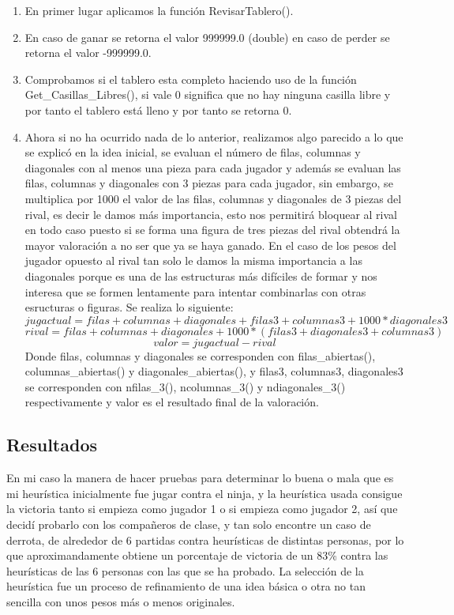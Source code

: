 \documentclass[a4paper, 10pt]{article} %
\begin{document}
\begin{enumerate}
\item En primer lugar aplicamos la función RevisarTablero().
\item En caso de ganar se retorna el valor 999999.0 (double) en caso de perder se retorna el valor -999999.0.
\item Comprobamos si el tablero esta completo haciendo uso de la función Get\_Casillas\_Libres(), si vale 0 significa que no hay ninguna casilla libre y por tanto el tablero está lleno y por tanto se retorna 0.
\item Ahora si no ha ocurrido nada de lo anterior, realizamos algo parecido a lo que se explicó en la idea inicial, se evaluan el número de filas, columnas y diagonales con al menos una pieza para cada jugador y además se evaluan las filas, columnas y diagonales con 3 piezas para cada jugador, sin embargo, se multiplica por 1000 el valor de las filas, columnas y diagonales de 3 piezas del rival, es decir le damos más importancia, esto nos permitirá bloquear al rival en todo caso puesto si se forma una figura de tres piezas del rival obtendrá la mayor valoración a no ser que ya se haya ganado. En el caso de los pesos del jugador opuesto al rival tan solo le damos la misma importancia a las diagonales porque es una de las estructuras más difíciles de formar y nos interesa que se formen lentamente para intentar combinarlas con otras esructuras o figuras. Se realiza lo siguiente:
$$jugactual=filas+columnas+diagonales+filas3+columnas3+1000*diagonales3$$
$$rival=filas+columnas+diagonales+1000*(filas3+diagonales3+columnas3)$$
$$valor=jugactual-rival$$
Donde filas, columnas y diagonales se corresponden con filas\_abiertas(), columnas\_abiertas() y diagonales\_abiertas(), y filas3, columnas3, diagonales3 se corresponden con nfilas\_3(), ncolumnas\_3() y ndiagonales\_3() respectivamente y valor es el resultado final de la valoración.
\end{enumerate}

\subsection{Resultados}
En mi caso la manera de hacer pruebas para determinar lo buena o mala que es mi heurística inicialmente fue jugar contra el ninja, y la heurística usada consigue la victoria tanto si empieza como jugador 1 o si empieza como jugador 2, así que decidí probarlo con los compañeros de clase, y tan solo encontre un caso de derrota, de alrededor de 6 partidas contra heurísticas de distintas personas, por lo que aproximandamente obtiene un porcentaje de victoria de un 83\% contra las heurísticas de las 6 personas con las que se ha probado. La selección de la heurística fue un proceso de refinamiento de una idea básica o otra no tan sencilla con unos pesos más o menos originales.
\end{document}
